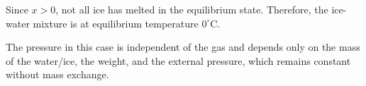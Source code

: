 Since \( x > 0 \), not all ice has melted in the equilibrium state. Therefore, the ice-water mixture is at equilibrium temperature \( 0^\circ \text{C} \).  

The pressure in this case is independent of the gas and depends only on the mass of the water/ice, the weight, and the external pressure, which remains constant without mass exchange.